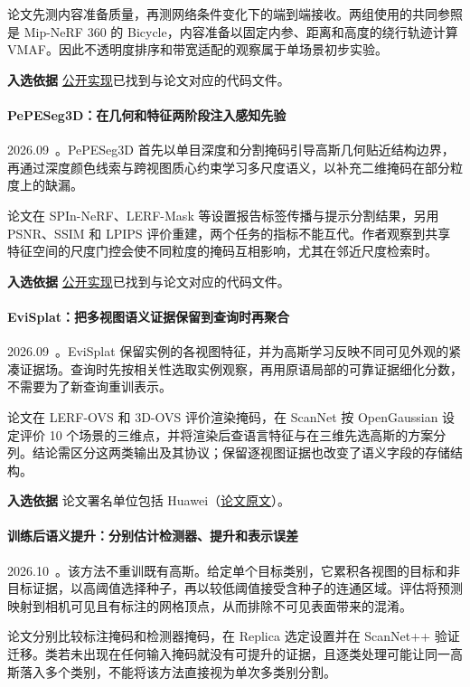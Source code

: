 论文先测内容准备质量，再测网络条件变化下的端到端接收。两组使用的共同参照是 Mip-NeRF 360 的 Bicycle，内容准备以固定内参、距离和高度的绕行轨迹计算 VMAF。因此不透明度排序和带宽适配的观察属于单场景初步实验。

\textbf{入选依据} \href{https://github.com/emanuele-artioli/moqsplat}{公开实现}已找到与论文对应的代码文件。

\paragraph{PePESeg3D：在几何和特征两阶段注入感知先验}
2026.09~\cite{2609_28645}。PePESeg3D 首先以单目深度和分割掩码引导高斯几何贴近结构边界，再通过深度颜色线索与跨视图质心约束学习多尺度语义，以补充二维掩码在部分粒度上的缺漏。

论文在 SPIn-NeRF、LERF-Mask 等设置报告标签传播与提示分割结果，另用 PSNR、SSIM 和 LPIPS 评价重建，两个任务的指标不能互代。作者观察到共享特征空间的尺度门控会使不同粒度的掩码互相影响，尤其在邻近尺度检索时。

\textbf{入选依据} \href{https://github.com/becow5x5/pepeseg3d}{公开实现}已找到与论文对应的代码文件。

\paragraph{EviSplat：把多视图语义证据保留到查询时再聚合}
2026.09~\cite{2609_34853}。EviSplat 保留实例的各视图特征，并为高斯学习反映不同可见外观的紧凑证据场。查询时先按相关性选取实例观察，再用原语局部的可靠证据细化分数，不需要为了新查询重训表示。

论文在 LERF-OVS 和 3D-OVS 评价渲染掩码，在 ScanNet 按 OpenGaussian 设定评价 10 个场景的三维点，并将渲染后查语言特征与在三维先选高斯的方案分列。结论需区分这两类输出及其协议；保留逐视图证据也改变了语义字段的存储结构。

\textbf{入选依据} 论文署名单位包括 Huawei（\href{https://arxiv.org/abs/2609.34853}{论文原文}）。

\paragraph{训练后语义提升：分别估计检测器、提升和表示误差}
2026.10~\cite{2610_08756}。该方法不重训既有高斯。给定单个目标类别，它累积各视图的目标和非目标证据，以高阈值选择种子，再以较低阈值接受含种子的连通区域。评估将预测映射到相机可见且有标注的网格顶点，从而排除不可见表面带来的混淆。

论文分别比较标注掩码和检测器掩码，在 Replica 选定设置并在 ScanNet++ 验证迁移。类若未出现在任何输入掩码就没有可提升的证据，且逐类处理可能让同一高斯落入多个类别，不能将该方法直接视为单次多类别分割。

